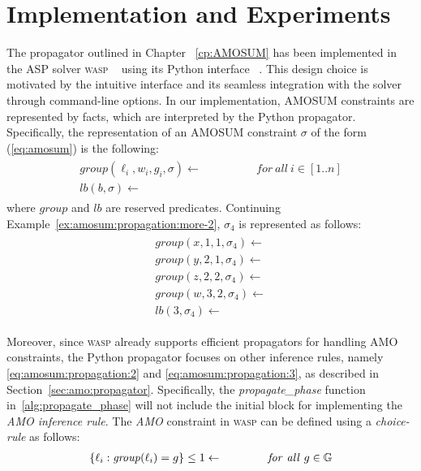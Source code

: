 \chapter{Implementation and Experiments}
\label{cp:implementation}
\label{cp:exp}
The propagator outlined in Chapter ~\ref{cp:AMOSUM} has been implemented in the ASP solver \textsc{wasp}
~\cite{DBLP:conf/lpnmr/AlvianoDLR15} using its Python interface ~\cite{DBLP:journals/tplp/DodaroR20}.
This design choice is motivated by the intuitive interface and its 
seamless integration with the solver through command-line options.
In our implementation, AMOSUM constraints are represented by facts, 
which are interpreted by the Python propagator. Specifically, the representation of an 
AMOSUM constraint $\sigma$ of the form (\ref{eq:amosum}) is the following:
\begin{align*}
\begin{array}{rr}
    \mathit{group}(\ell_i, w_i, g_i, \sigma) \leftarrow & \qquad\qquad \mathit{for\ all\ } i \in [1..n]\\
    \mathit{lb}(b, \sigma) \leftarrow
\end{array}
\end{align*}
where $\mathit{group}$ and $\mathit{lb}$ are reserved predicates.
Continuing Example~\ref{ex:amosum:propagation:more-2}, $\sigma_4$ is represented as follows:
\begin{align*}
\begin{array}{rr}
    \mathit{group}(x, 1, 1, \sigma_4) \leftarrow \\
    \mathit{group}(y, 2, 1, \sigma_4) \leftarrow \\
    \mathit{group}(z, 2, 2, \sigma_4) \leftarrow \\
    \mathit{group}(w, 3, 2, \sigma_4) \leftarrow \\
    \mathit{lb}(3, \sigma_4) \leftarrow 
\end{array}
\end{align*}

Moreover, since \textsc{wasp} already supports efficient propagators for handling AMO constraints, 
the Python propagator focuses on other inference rules, namely \eqref{eq:amosum:propagation:2} and \eqref{eq:amosum:propagation:3}, 
as described in Section~\ref{sec:amo:propagator}. Specifically, the \textit{propagate\_phase} function 
in~\ref{alg:propagate_phase} will not include the initial block for implementing the \textit{AMO inference rule}.
The \textit{AMO} constraint in \textsc{wasp} can be defined using a \textit{choice-rule} as follows:
\begin{align*}
    \{\ell_i : \mathit{group}(\ell_i) = g\} \le 1 \leftarrow  \qquad\qquad \mathit{for\ all\ } g \in \mathbb{G}
\end{align*}

